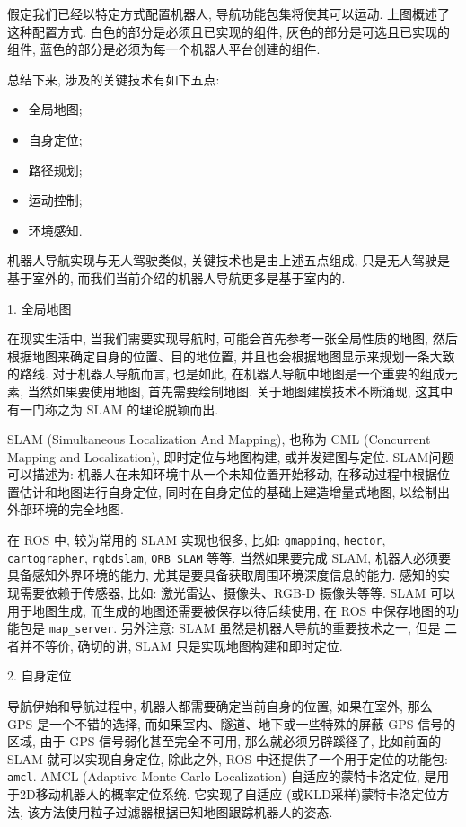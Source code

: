 \documentclass[openany, fontset=windowsold]{ctexbook}
\theoremstyle{kaiti}
\theoremstyle{normal}
\begin{document}
假定我们已经以特定方式配置机器人, 导航功能包集将使其可以运动. 上图概述了这种配置方式. 白色的部分是必须且已实现的组件, 灰色的部分是可选且已实现的组件, 蓝色的部分是必须为每一个机器人平台创建的组件.

总结下来, 涉及的关键技术有如下五点:

\begin{itemize}
  \item 全局地图;
  \item 自身定位;
  \item 路径规划;
  \item 运动控制;
  \item 环境感知.
\end{itemize}

机器人导航实现与无人驾驶类似, 关键技术也是由上述五点组成, 只是无人驾驶是基于室外的, 而我们当前介绍的机器人导航更多是基于室内的.

1. 全局地图

在现实生活中, 当我们需要实现导航时, 可能会首先参考一张全局性质的地图, 然后根据地图来确定自身的位置、目的地位置, 并且也会根据地图显示来规划一条大致的路线. 对于机器人导航而言, 也是如此, 在机器人导航中地图是一个重要的组成元素, 当然如果要使用地图, 首先需要绘制地图. 关于地图建模技术不断涌现, 这其中有一门称之为 SLAM 的理论脱颖而出.

SLAM (Simultaneous Localization And Mapping), 也称为 CML (Concurrent Mapping and Localization), 即时定位与地图构建, 或并发建图与定位. SLAM问题可以描述为: 机器人在未知环境中从一个未知位置开始移动, 在移动过程中根据位置估计和地图进行自身定位, 同时在自身定位的基础上建造增量式地图, 以绘制出外部环境的完全地图.

在 ROS 中, 较为常用的 SLAM 实现也很多, 比如: \verb|gmapping|, \verb|hector|, \verb|cartographer|, \verb|rgbdslam|, \verb|ORB_SLAM| 等等. 当然如果要完成 SLAM, 机器人必须要具备感知外界环境的能力, 尤其是要具备获取周围环境深度信息的能力. 感知的实现需要依赖于传感器, 比如: 激光雷达、摄像头、RGB-D 摄像头等等. SLAM 可以用于地图生成, 而生成的地图还需要被保存以待后续使用, 在 ROS 中保存地图的功能包是 \verb|map_server|. 另外注意: SLAM 虽然是机器人导航的重要技术之一, 但是 二者并不等价, 确切的讲, SLAM 只是实现地图构建和即时定位.

2. 自身定位

导航伊始和导航过程中, 机器人都需要确定当前自身的位置, 如果在室外, 那么 GPS 是一个不错的选择, 而如果室内、隧道、地下或一些特殊的屏蔽 GPS 信号的区域, 由于 GPS 信号弱化甚至完全不可用, 那么就必须另辟蹊径了, 比如前面的 SLAM 就可以实现自身定位, 除此之外, ROS 中还提供了一个用于定位的功能包: \verb|amcl|. AMCL (Adaptive Monte Carlo Localization) 自适应的蒙特卡洛定位, 是用于2D移动机器人的概率定位系统. 它实现了自适应 (或KLD采样)蒙特卡洛定位方法, 该方法使用粒子过滤器根据已知地图跟踪机器人的姿态.
\end{document}
